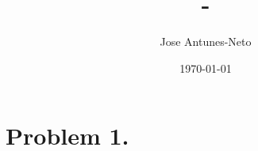\documentclass[12pt,twoside]{article}
\title{\course-\assignment}
\author{Jose Antunes-Neto}
\date{\today}
\begin{document}
\maketitle

\section{Problem 1.}
\lipsum[1]
\begin{prop}
    \lipsum[2]
\end{prop}

\begin{solution}
    \lipsum[3]
\end{solution}
\clearpage


\end{document}
